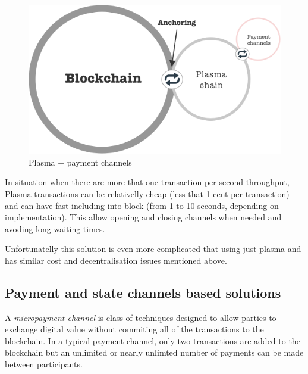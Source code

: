 \documentclass[a4paper,12pt]{article}
\begin{document}
\begin{figure}[H]
    \centering
    \includegraphics[scale=0.5]{img/plasma-channels}
    \caption{Plasma + payment channels}
    \label{img:plasma-channels}
\end{figure}

In situation when there are more that one transaction per second throughput, 
Plasma transactions can be relativelly cheap (less that 1 cent per transaction)
and can have fast including into block (from 1 to 10 seconds, depending on 
implementation). This allow opening and closing channels when needed and avoding
long waiting times.

Unfortunatelly this solution is even more complicated that using just plasma and
has similar cost and decentralisation issues mentioned above.

\subsection{Payment and state channels based solutions}

A \textit{micropayment channel} is class of techniques designed to allow parties
to exchange digital value without commiting all of the transactions to the 
blockchain. In a typical payment channel, only two transactions are added to the 
blockchain but an unlimited or nearly unlimted number of payments can be made 
between participants.
\end{document}
